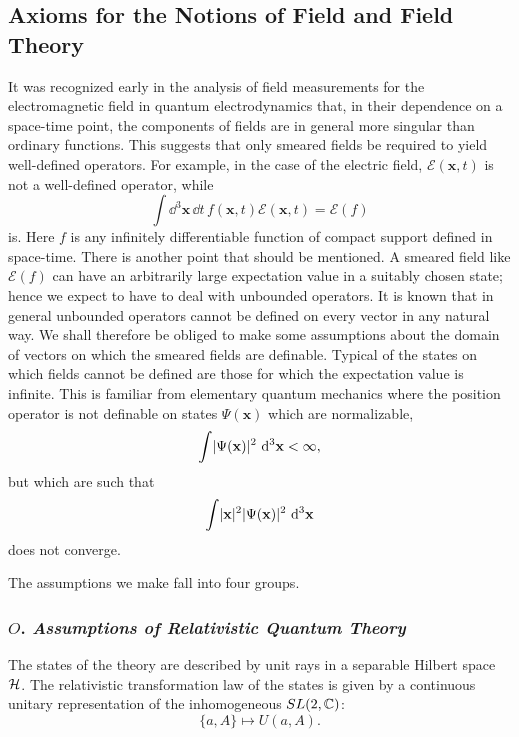 \subsection{Axioms for the Notions of Field and Field Theory}
\label{sec:ch3-1-axioms}

It was recognized early in the analysis of field measurements for the
electromagnetic field in quantum electrodynamics that, in their dependence on
a space-time point, the components of fields are in general more singular
than ordinary functions. This suggests that only smeared fields be required
to yield well-defined operators. For example, in the case of the electric
field, $\mathcal{E}(\mathbf{x},t)$ is not a well-defined operator, while
\begin{equation*}
  \int \dd^3\mathbf{x}\,\dd t\,f(\mathbf{x},t)\mathcal{E}(\mathbf{x},t)
  =\mathcal{E}(f)
\end{equation*}
is. Here $f$ is any infinitely differentiable function of compact support
defined in space-time. There is another point that should be mentioned. A
smeared field like $\mathcal{E}(f)$ can have an arbitrarily large expectation
value in a suitably chosen state; hence we expect to have to deal with
unbounded operators. It is known that in general unbounded operators cannot
be defined on every vector in any natural way. We shall therefore be obliged
to make some assumptions about the domain of vectors on which the smeared
fields are definable. Typical of the states on which fields cannot be defined
are those for which the expectation value is infinite. This is familiar from
elementary quantum mechanics where the position operator is not definable on
states $\Psi(\mathbf{x})$ which are normalizable,
\begin{equation*}
  \int \lvert\Psi(\mathbf{x})\rvert^2\,\mathop{}\!\mathrm{d}^3\mathbf{x}<\infty,
\end{equation*}
but which are such that
\begin{equation*}
  \int \lvert\mathbf{x}\rvert^2\lvert\Psi(\mathbf{x})\rvert^2\,\mathop{}\!\mathrm{d}^3\mathbf{x}
\end{equation*}
does not converge.

The assumptions we make fall into four groups.

\subsubsection*{$O$. \emph{Assumptions of Relativistic Quantum Theory}}

The states of the theory are described by unit rays in a separable Hilbert
space $\mathcal{H}$. The relativistic transformation law of the states is given
by a continuous unitary representation of the inhomogeneous $SL(2,\mathbb{C})$:
\begin{equation*}
  \{a,A\}\longmapsto U(a,A).
\end{equation*}

